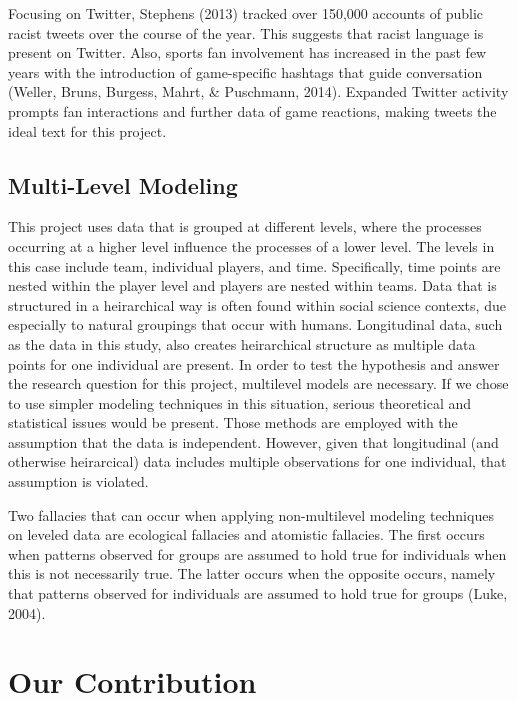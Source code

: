 \documentclass[12pt,twoside]{reedthesis}
\begin{document}
Focusing on Twitter, Stephens (2013) tracked over 150,000 accounts of
public racist tweets over the course of the year. This suggests that
racist language is present on Twitter. Also, sports fan involvement has
increased in the past few years with the introduction of game-specific
hashtags that guide conversation (Weller, Bruns, Burgess, Mahrt, \&
Puschmann, 2014). Expanded Twitter activity prompts fan interactions and
further data of game reactions, making tweets the ideal text for this
project.

\subsection{Multi-Level Modeling}\label{multi-level-modeling}

This project uses data that is grouped at different levels, where the
processes occurring at a higher level influence the processes of a lower
level. The levels in this case include team, individual players, and
time. Specifically, time points are nested within the player level and
players are nested within teams. Data that is structured in a
heirarchical way is often found within social science contexts, due
especially to natural groupings that occur with humans. Longitudinal
data, such as the data in this study, also creates heirarchical
structure as multiple data points for one individual are present. In
order to test the hypothesis and answer the research question for this
project, multilevel models are necessary. If we chose to use simpler
modeling techniques in this situation, serious theoretical and
statistical issues would be present. Those methods are employed with the
assumption that the data is independent. However, given that
longitudinal (and otherwise heirarcical) data includes multiple
observations for one individual, that assumption is violated.

Two fallacies that can occur when applying non-multilevel modeling
techniques on leveled data are ecological fallacies and atomistic
fallacies. The first occurs when patterns observed for groups are
assumed to hold true for individuals when this is not necessarily true.
The latter occurs when the opposite occurs, namely that patterns
observed for individuals are assumed to hold true for groups (Luke,
2004).

\section{Our Contribution}\label{our-contribution}
\end{document}
